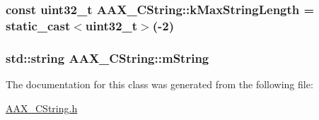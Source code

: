 \subsubsection[{k\+Max\+String\+Length}]{\setlength{\rightskip}{0pt plus 5cm}const uint32\+\_\+t A\+A\+X\+\_\+\+C\+String\+::k\+Max\+String\+Length = static\+\_\+cast$<$uint32\+\_\+t$>$(-\/2)\hspace{0.3cm}{\ttfamily [static]}}\label{a00042_aac7fe2ef7191455a685602c9122ce515}
\hypertarget{a00042_a57df174f0327d832016b05ec17bcf87c}{}
\subsubsection[{m\+String}]{\setlength{\rightskip}{0pt plus 5cm}std\+::string A\+A\+X\+\_\+\+C\+String\+::m\+String\hspace{0.3cm}{\ttfamily [protected]}}\label{a00042_a57df174f0327d832016b05ec17bcf87c}


The documentation for this class was generated from the following file\+:\begin{DoxyCompactItemize}
\item 
\hyperlink{a00197}{A\+A\+X\+\_\+\+C\+String.\+h}\end{DoxyCompactItemize}
